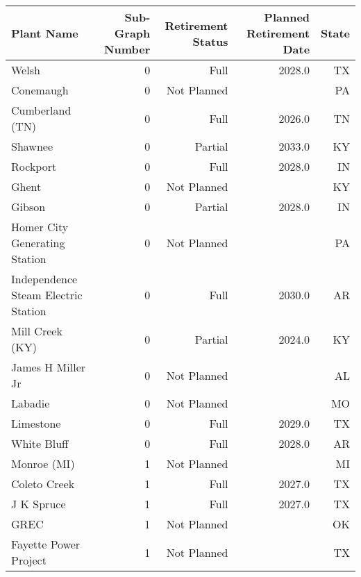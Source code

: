 \begin{table}[htb]
  \centering
  \small
  \begin{adjustbox}{width=\textwidth}
     \begin{tabular}{|l|r|r|r|r|}
         \toprule
         Plant Name & Sub-Graph Number & Retirement Status & Planned Retirement Date & State \\
         \midrule
         Welsh &         0 &           Full &           2028.0 &    TX \\
         Conemaugh &         0 &           Not Planned &                &    PA \\
   Cumberland (TN) &         0 &           Full &           2026.0 &    TN \\
           Shawnee &         0 &           Partial &           2033.0 &    KY \\
          Rockport &         0 &           Full &           2028.0 &    IN \\
             Ghent &         0 &           Not Planned &                &    KY \\
            Gibson &         0 &           Partial &           2028.0 &    IN \\
Homer City Generating Station &         0 &           Not Planned &                &    PA \\
Independence Steam Electric Station &         0 &           Full &           2030.0 &    AR \\
   Mill Creek (KY) &         0 &           Partial &           2024.0 &    KY \\
 James H Miller Jr &         0 &           Not Planned &                &    AL \\
           Labadie &         0 &           Not Planned &                &    MO \\
         Limestone &         0 &           Full &           2029.0 &    TX \\
       White Bluff &         0 &           Full &           2028.0 &    AR \\
       Monroe (MI) &         1 &           Not Planned &                &    MI \\
      Coleto Creek &         1 &           Full &           2027.0 &    TX \\
        J K Spruce &         1 &           Full &           2027.0 &    TX \\
              GREC &         1 &           Not Planned &                &   OK  \\
Fayette Power Project &         1 &           Not Planned &                &   TX \\

\end{tabular}
\end{adjustbox}
\end{table}
